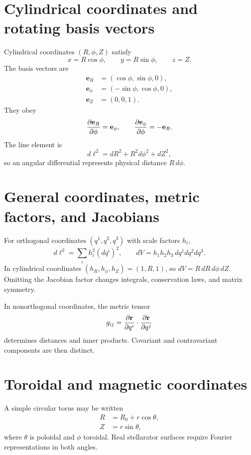 \documentclass[11pt]{article}
\begin{document}
\section{Cylindrical coordinates and rotating basis vectors}

Cylindrical coordinates $(R,\phi,Z)$ satisfy
\begin{equation}
x=R\cos\phi,\qquad y=R\sin\phi,\qquad z=Z.
\end{equation}
The basis vectors are
\begin{align}
\mathbf e_R&=(\cos\phi,\sin\phi,0),\\
\mathbf e_\phi&=(-\sin\phi,\cos\phi,0),\\
\mathbf e_Z&=(0,0,1).
\end{align}
They obey
\begin{equation}
\pdv{\mathbf e_R}{\phi}=\mathbf e_\phi,
\qquad
\pdv{\mathbf e_\phi}{\phi}=-\mathbf e_R.
\end{equation}
The line element is
\begin{equation}
d\ell^2=dR^2+R^2d\phi^2+dZ^2,
\end{equation}
so an angular differential represents physical distance $R\,d\phi$.


\section{General coordinates, metric factors, and Jacobians}

For orthogonal coordinates $(q^1,q^2,q^3)$ with scale factors $h_i$,
\begin{equation}
d\ell^2=\sum_i h_i^2(dq^i)^2,
\qquad
dV=h_1h_2h_3\,dq^1dq^2dq^3.
\end{equation}
In cylindrical coordinates $(h_R,h_\phi,h_Z)=(1,R,1)$, so $dV=R\,dR\,d\phi\,dZ$. Omitting the Jacobian factor changes integrals, conservation laws, and matrix symmetry.

In nonorthogonal coordinates, the metric tensor
\begin{equation}
g_{ij}=\pdv{\mathbf r}{q^i}\cdot\pdv{\mathbf r}{q^j}
\end{equation}
determines distances and inner products. Covariant and contravariant components are then distinct.


\section{Toroidal and magnetic coordinates}

A simple circular torus may be written
\begin{align}
R&=R_0+r\cos\theta,\\
Z&=r\sin\theta,
\end{align}
where $\theta$ is poloidal and $\phi$ toroidal. Real stellarator surfaces require Fourier representations in both angles.
\end{document}
